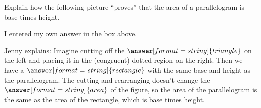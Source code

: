 \documentclass[nooutcomes]{ximera}
\begin{document}
\begin{problem}
Explain how the following picture ``proves'' that the area of a
  parallelogram is base times height.
\begin{image}
\end{image}
\begin{freeResponse}
\end{freeResponse}

I  entered my own answer in the box above.  

\begin{problem}
Jenny explains: Imagine cutting off the $\answer[format=string]{triangle}$ on the left and placing it in the (congruent) dotted region on the right.  Then we have a $\answer[format=string]{rectangle}$ with the same base and height as the parallelogram.  The cutting and rearranging doesn't change the $\answer[format=string]{area}$ of the figure, so the area of the parallelogram is the same as the area of the rectangle, which is base times height. 
\end{problem}
\end{problem}
\end{document}
